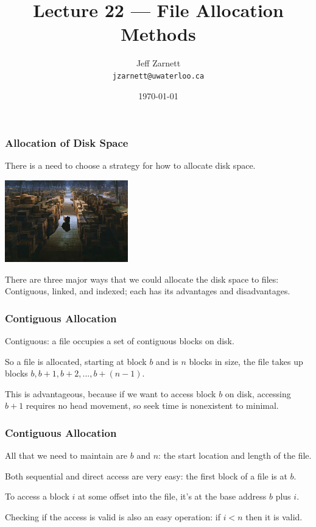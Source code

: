 

\title{Lecture 22 --- File Allocation Methods }

\author{Jeff Zarnett \\ \small \texttt{jzarnett@uwaterloo.ca}}
\date{\today}




\begin{frame}
  \titlepage

 \end{frame}


\begin{frame}
\frametitle{Allocation of Disk Space}

There is a need to choose a strategy for how to allocate disk space. 

\begin{center}
	\includegraphics[width=0.4\textwidth]{images/jones.jpg}
\end{center}

There are three major ways that we could allocate the disk space to files:\\
\quad Contiguous, linked, and indexed; each has its advantages and disadvantages.


\end{frame}

\begin{frame}
\frametitle{Contiguous Allocation}
Contiguous: a file occupies a set of contiguous blocks on disk. 

So a file is allocated, starting at block $b$ and is $n$ blocks in size, the file takes up blocks $b, b+1, b+2, ..., b+(n-1)$. 

This is advantageous, because if we want to access block $b$ on disk, accessing $b+1$ requires no head movement, so seek time is nonexistent to minimal.

\end{frame}

\begin{frame}
\frametitle{Contiguous Allocation}

All that we need to maintain are $b$ and $n$: the start location and length of the file. 

Both sequential and direct access are very easy: the first block of a file is at $b$. 

To access a block $i$ at some offset into the file, it's at the base address $b$ plus $i$. 

Checking if the access is valid is also an easy operation: if $i < n$ then it is valid.

\end{frame}

